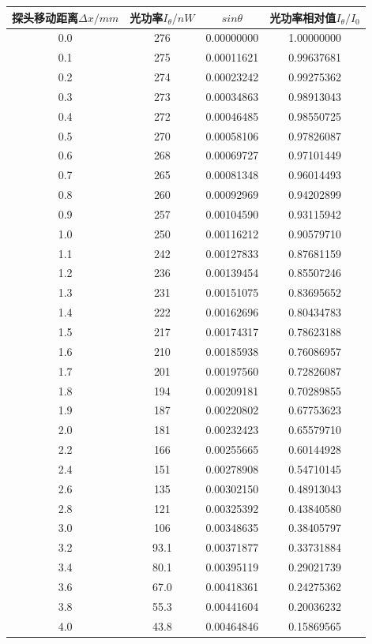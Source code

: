 \documentclass[12pt,a4paper,UTF8]{ctexart}
\begin{document}
\begin{table}[htbp]
	\caption{光强分布相关数据}
	\centering
    \begin{longtable}{cccc}
	\toprule
	探头移动距离$\varDelta x/mm$ & 光功率$I_\theta/nW$ &$sin\theta $ &光功率相对值$I_\theta/I_0 $\\
	\midrule

	0.0&276&0.00000000&1.00000000 \\
	0.1&275&0.00011621&0.99637681 \\
	0.2&274&0.00023242&0.99275362 \\
	0.3&273&0.00034863&0.98913043 \\
	0.4&272&0.00046485&0.98550725 \\
	0.5&270&0.00058106&0.97826087 \\
	0.6&268&0.00069727&0.97101449 \\
	0.7&265&0.00081348&0.96014493 \\
	0.8&260&0.00092969&0.94202899 \\
	0.9&257&0.00104590&0.93115942 \\
	1.0&250&0.00116212&0.90579710 \\
	1.1&242&0.00127833&0.87681159 \\
	1.2&236&0.00139454&0.85507246 \\
	1.3&231&0.00151075&0.83695652 \\
	1.4&222&0.00162696&0.80434783 \\
	1.5&217&0.00174317&0.78623188 \\
	1.6&210&0.00185938&0.76086957 \\
	1.7&201&0.00197560&0.72826087 \\
	1.8&194&0.00209181&0.70289855 \\
	1.9&187&0.00220802&0.67753623 \\
	2.0&181&0.00232423&0.65579710 \\
	2.2&166&0.00255665&0.60144928 \\
	2.4&151&0.00278908&0.54710145 \\
	2.6&135&0.00302150&0.48913043 \\
	2.8&121&0.00325392&0.43840580 \\
	3.0&106&0.00348635&0.38405797 \\
	3.2&93.1&0.00371877&0.33731884 \\
	3.4&80.1&0.00395119&0.29021739 \\
	3.6&67.0&0.00418361&0.24275362 \\
	3.8&55.3&0.00441604&0.20036232 \\
	4.0&43.8&0.00464846&0.15869565 \\

\end{longtable}
\end{table}
\end{document}
